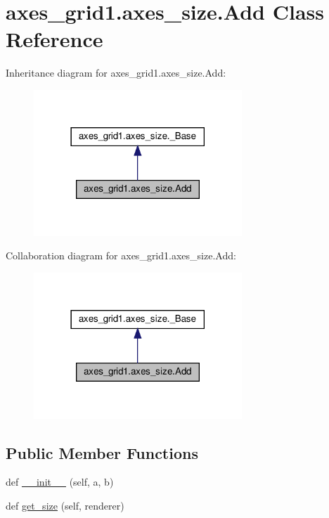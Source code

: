\hypertarget{classaxes__grid1_1_1axes__size_1_1Add}{}\section{axes\+\_\+grid1.\+axes\+\_\+size.\+Add Class Reference}
\label{classaxes__grid1_1_1axes__size_1_1Add}


Inheritance diagram for axes\+\_\+grid1.\+axes\+\_\+size.\+Add\+:
\nopagebreak
\begin{figure}[H]
\begin{center}
\leavevmode
\includegraphics[width=222pt]{classaxes__grid1_1_1axes__size_1_1Add__inherit__graph}
\end{center}
\end{figure}


Collaboration diagram for axes\+\_\+grid1.\+axes\+\_\+size.\+Add\+:
\nopagebreak
\begin{figure}[H]
\begin{center}
\leavevmode
\includegraphics[width=222pt]{classaxes__grid1_1_1axes__size_1_1Add__coll__graph}
\end{center}
\end{figure}
\subsection*{Public Member Functions}
\begin{DoxyCompactItemize}
\item 
def \hyperlink{classaxes__grid1_1_1axes__size_1_1Add_a3f4068c7f5a066b003c50ded550dc4a0}{\+\_\+\+\_\+init\+\_\+\+\_\+} (self, a, b)
\item 
def \hyperlink{classaxes__grid1_1_1axes__size_1_1Add_a11bd792fd87459af2d5f126c7c22384b}{get\+\_\+size} (self, renderer)
\end{DoxyCompactItemize}



